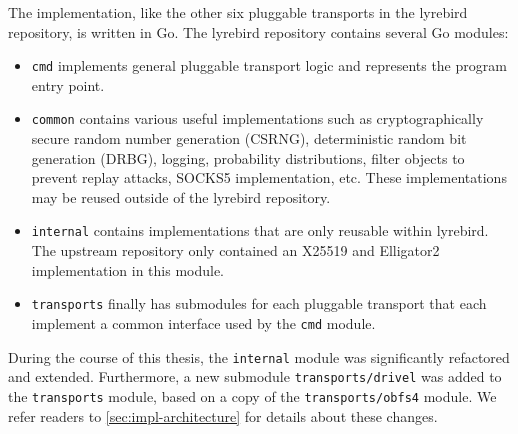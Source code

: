 The \drivel{} implementation, like the other six pluggable transports in the lyrebird repository, is written in Go. The lyrebird repository contains several Go modules:
\begin{itemize}
    \item \texttt{cmd} implements general pluggable transport logic and represents the program entry point.
    
    \item \texttt{common} contains various useful implementations such as cryptographically secure random number generation (CSRNG), deterministic random bit generation (DRBG), logging, probability distributions, filter objects to prevent replay attacks, SOCKS5 implementation, etc. These implementations may be reused outside of the lyrebird repository.
    
    \item \texttt{internal} contains implementations that are only reusable within lyrebird. The upstream repository only contained an X25519 and \textsf{Elligator2}~\cite{CCS:BHKL13} implementation in this module.
    
    \item \texttt{transports} finally has submodules for each pluggable transport that each implement a common interface used by the \texttt{cmd} module.
\end{itemize}

During the course of this thesis, the \texttt{internal} module was significantly refactored and extended. Furthermore, a new submodule \texttt{transports/drivel} was added to the \texttt{transports} module, based on a copy of the \texttt{transports/obfs4} module. We refer readers to \cref{sec:impl-architecture} for details about these changes.

